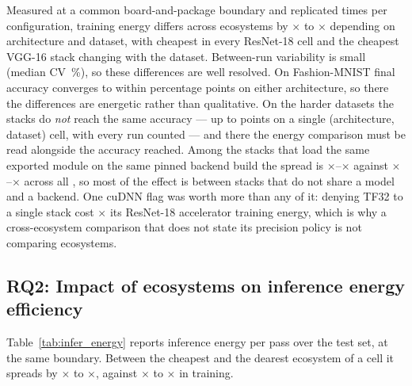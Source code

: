 \begin{tcolorbox}[colback=gray!5!white, colframe=gray!40!black, title=\textbf{RQ1 Findings: Impact of Ecosystems on Training Energy Efficiency}]
\small
Measured at a common board-and-package boundary and replicated \vRepetitions{} times
per configuration, training energy differs across ecosystems by
\vSpreadTrainMin$\times$ to \vSpreadTrainMax$\times$ depending on architecture
and dataset, with \vSpreadTrainBest{} cheapest in every ResNet-18 cell and the
cheapest VGG-16 stack changing with the dataset. Between-run
variability is small (median CV \vCVTrainMedian\,\%), so these differences are
well resolved. On Fashion-MNIST final accuracy converges to within
\vAccBlockSpreadFashionMax{} percentage points on either architecture, so there
the differences are energetic rather than qualitative. On the harder datasets the stacks do \emph{not} reach
the same accuracy --- up to \vAccBlockSpreadTrainedMax{} points on a single
(architecture, dataset) cell, with every run counted --- and there the
energy comparison must be read alongside the accuracy reached. Among the
\vCtrlStacks{} stacks that load the same exported module on the same pinned
backend build the spread is \vCtrlSpreadMin$\times$--\vCtrlSpreadMax$\times$
against \vSpreadTrainMin$\times$--\vSpreadTrainMax$\times$ across all \vEcosystems{}, so most of the
effect is between stacks that do not share a model and a backend. One cuDNN
flag was worth more than any of it: denying TF32 to a single stack cost
\vPrecisionPytorchRatioMin$\times$ its ResNet-18 accelerator training energy, which is why
a cross-ecosystem comparison that does not state its precision policy is not
comparing ecosystems.
\end{tcolorbox}

\subsection{RQ2: Impact of ecosystems on inference energy efficiency}
\label{subsec:rq2}

Table~\ref{tab:infer_energy} reports inference energy per pass over the test
set, at the same boundary. Between the cheapest and the dearest ecosystem of a
cell it spreads by \vSpreadInferMin$\times$ to \vSpreadInferMax$\times$,
against \vSpreadTrainMin$\times$ to \vSpreadTrainMax$\times$ in training.

\begin{table}[t]
\centering
\caption{Mean inference energy per evaluation pass (J), accelerator plus CPU package.}
\label{tab:infer_energy}

\end{table}

